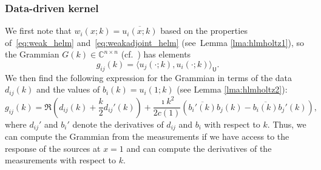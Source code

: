 \documentclass[12pt]{amsart}
\newcommand{\yy}[1]{\textcolor{blue}{{YY: #1}}}
\begin{document}
\subsubsection{Data-driven kernel}
We first note that $w_i(x;k) = \overline{u_i(x;k)}$ based on the properties of~\eqref{eq:weak_helm} and~\eqref{eq:weakadjoint_helm} (see~Lemma \ref{lma:hlmholtz1}), so  the Grammian $G(k) \in \mathbb{C}^{n\times n}$ (cf.~) has elements
\[
g_{ij}(k) = \langle u_j(\cdot;k), u_i(\cdot;k)\rangle_{\mathsf{U}}.
\]
We then find the following expression for the Grammian in terms of the data $d_{ij}(k)$ and the values of $b_i(k) = u_i(1;k)$ (see Lemma \ref{lma:hlmholtz2}):
\begin{equation}
\label{eq:data_gram_helm}
g_{ij}(k) = \Re\left(d_{ij}(k) + {\textstyle\frac{k}{2}}d_{ij}'(k)\right) + {\textstyle\frac{\imath k^2}{2c(1)}}\left(\overline{b_i'(k)}b_j(k) - \overline{b_i(k)}b_j'(k)\right),
\end{equation}
where $d_{ij}'$ and $b_i'$ denote the derivatives of $d_{ij}$ and $b_i$ with respect to $k$. Thus, we can compute the Grammian from the measurements if we have access to the response of the sources at $x=1$ and can compute the derivatives of the measurements with respect to $k$.

\end{document}
